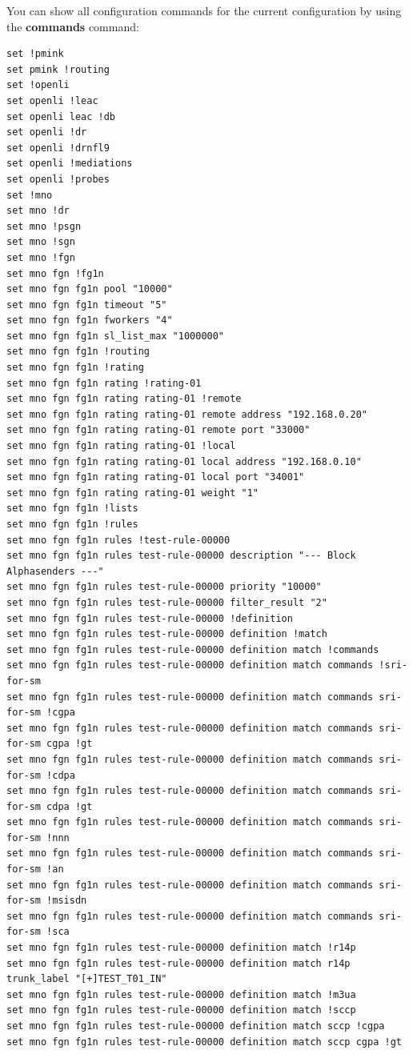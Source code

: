 \documentclass[a4paper,latin]{paper}
\begin{document}
You can show all configuration commands for the current configuration by using the
\textbf{commands} command:
\begin{lstlisting}[style=BashInputStyle]
set !pmink
set pmink !routing
set !openli
set openli !leac
set openli leac !db
set openli !dr
set openli !drnfl9
set openli !mediations
set openli !probes
set !mno
set mno !dr
set mno !psgn
set mno !sgn
set mno !fgn
set mno fgn !fg1n
set mno fgn fg1n pool "10000"
set mno fgn fg1n timeout "5"
set mno fgn fg1n fworkers "4"
set mno fgn fg1n sl_list_max "1000000"
set mno fgn fg1n !routing
set mno fgn fg1n !rating
set mno fgn fg1n rating !rating-01
set mno fgn fg1n rating rating-01 !remote
set mno fgn fg1n rating rating-01 remote address "192.168.0.20"
set mno fgn fg1n rating rating-01 remote port "33000"
set mno fgn fg1n rating rating-01 !local
set mno fgn fg1n rating rating-01 local address "192.168.0.10"
set mno fgn fg1n rating rating-01 local port "34001"
set mno fgn fg1n rating rating-01 weight "1"
set mno fgn fg1n !lists
set mno fgn fg1n !rules
set mno fgn fg1n rules !test-rule-00000
set mno fgn fg1n rules test-rule-00000 description "--- Block Alphasenders ---"
set mno fgn fg1n rules test-rule-00000 priority "10000"
set mno fgn fg1n rules test-rule-00000 filter_result "2"
set mno fgn fg1n rules test-rule-00000 !definition
set mno fgn fg1n rules test-rule-00000 definition !match
set mno fgn fg1n rules test-rule-00000 definition match !commands
set mno fgn fg1n rules test-rule-00000 definition match commands !sri-for-sm
set mno fgn fg1n rules test-rule-00000 definition match commands sri-for-sm !cgpa
set mno fgn fg1n rules test-rule-00000 definition match commands sri-for-sm cgpa !gt
set mno fgn fg1n rules test-rule-00000 definition match commands sri-for-sm !cdpa
set mno fgn fg1n rules test-rule-00000 definition match commands sri-for-sm cdpa !gt
set mno fgn fg1n rules test-rule-00000 definition match commands sri-for-sm !nnn
set mno fgn fg1n rules test-rule-00000 definition match commands sri-for-sm !an
set mno fgn fg1n rules test-rule-00000 definition match commands sri-for-sm !msisdn
set mno fgn fg1n rules test-rule-00000 definition match commands sri-for-sm !sca
set mno fgn fg1n rules test-rule-00000 definition match !r14p
set mno fgn fg1n rules test-rule-00000 definition match r14p trunk_label "[+]TEST_T01_IN"
set mno fgn fg1n rules test-rule-00000 definition match !m3ua
set mno fgn fg1n rules test-rule-00000 definition match !sccp
set mno fgn fg1n rules test-rule-00000 definition match sccp !cgpa
set mno fgn fg1n rules test-rule-00000 definition match sccp cgpa !gt

\end{lstlisting}
\end{document}
